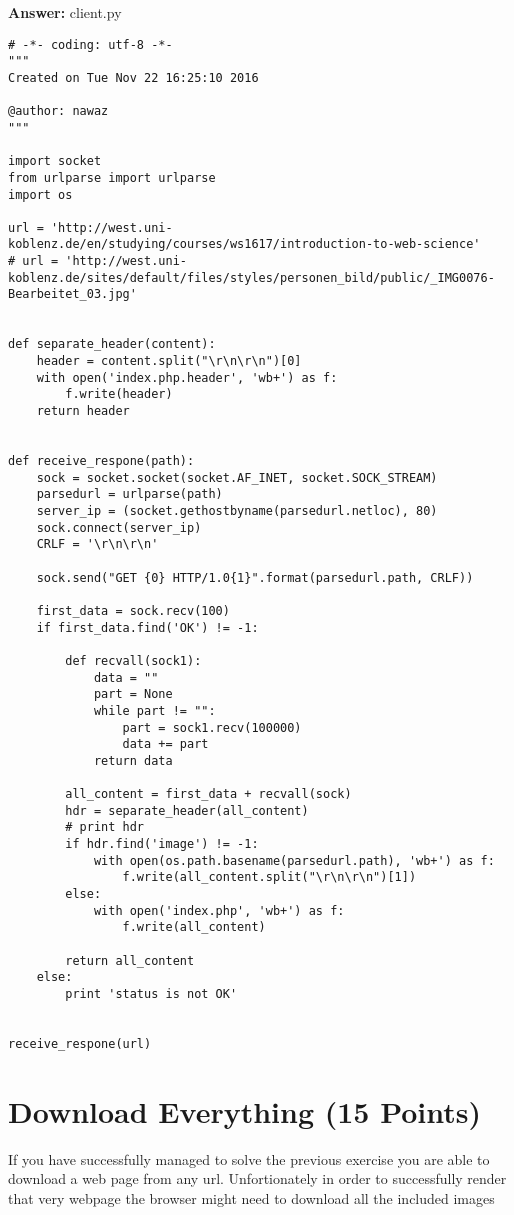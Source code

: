 \documentclass{WeSTassignment}
\begin{document}
\textbf{Answer:} client.py
\begin{lstlisting}
# -*- coding: utf-8 -*-
"""
Created on Tue Nov 22 16:25:10 2016

@author: nawaz
"""

import socket
from urlparse import urlparse
import os

url = 'http://west.uni-koblenz.de/en/studying/courses/ws1617/introduction-to-web-science'
# url = 'http://west.uni-koblenz.de/sites/default/files/styles/personen_bild/public/_IMG0076-Bearbeitet_03.jpg'


def separate_header(content):
    header = content.split("\r\n\r\n")[0]
    with open('index.php.header', 'wb+') as f:
        f.write(header)
    return header


def receive_respone(path):
    sock = socket.socket(socket.AF_INET, socket.SOCK_STREAM)
    parsedurl = urlparse(path)
    server_ip = (socket.gethostbyname(parsedurl.netloc), 80)
    sock.connect(server_ip)
    CRLF = '\r\n\r\n'

    sock.send("GET {0} HTTP/1.0{1}".format(parsedurl.path, CRLF))

    first_data = sock.recv(100)
    if first_data.find('OK') != -1:

        def recvall(sock1):
            data = ""
            part = None
            while part != "":
                part = sock1.recv(100000)
                data += part
            return data

        all_content = first_data + recvall(sock)
        hdr = separate_header(all_content)
        # print hdr
        if hdr.find('image') != -1:
            with open(os.path.basename(parsedurl.path), 'wb+') as f:
                f.write(all_content.split("\r\n\r\n")[1])
        else:
            with open('index.php', 'wb+') as f:
                f.write(all_content)

        return all_content
    else:
        print 'status is not OK'


receive_respone(url)

\end{lstlisting}



\section{Download Everything (15 Points)}

If you have successfully managed to solve the previous exercise you are able to download a web page from any url. Unfortionately in order to successfully render that very webpage the browser might need to download all the included images
\end{document}
